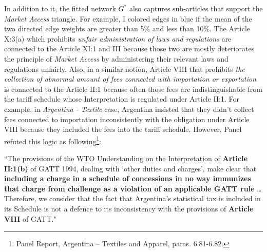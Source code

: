  In addition to it,
 the fitted network $G^*$ also captures sub-articles that support the \textit{Market Access} triangle. For example, I colored edges in blue if the mean of the two directed edge weights are greater than 5\% and less than 10\%.
 The Article X:3(a) which prohibits \textit{unfair administration of laws and regulations} are connected to the Article XI:1 and III because those two are mostly
 deteriorates the principle of \textit{Market Access} by administering their relevant laws and regulations unfairly. Also, in a similar notion, Article VIII that prohibits \textit{the collection of abnormal amount of fees connected with importation or exportation} is connected to the Article II:1 because
 often those fees are indistinguishable from the tariff schedule whose Interpretation is regulated under Article II:1. For example, in \textit{Argentina - Textile} case, Argentina insisted that they didn't collect fees connected to importation inconsistently with the obligation under Article VIII because they included the fees into the tariff schedule. %
 However, Panel refuted this logic as following\footnote{Panel Report, Argentina – Textiles and Apparel, paras. 6.81-6.82.}:
  
 \begin{displayquote}[][]
 ``The provisions of the WTO Understanding on the Interpretation of \textbf{Article II:1(b)} of
 GATT 1994, dealing with `other duties and charges’, make clear that \textbf{including a
 charge in a schedule of concessions in no way immunizes that charge from challenge
 as a violation of an applicable GATT rule} \ldots Therefore, we consider that the fact that Argentina's statistical tax is included in its
 Schedule is not a defence to its inconsistency with the provisions of \textbf{Article VIII} of
 GATT."
 \end{displayquote}
  
  
  
  
  
  
  
  
  
 
 
